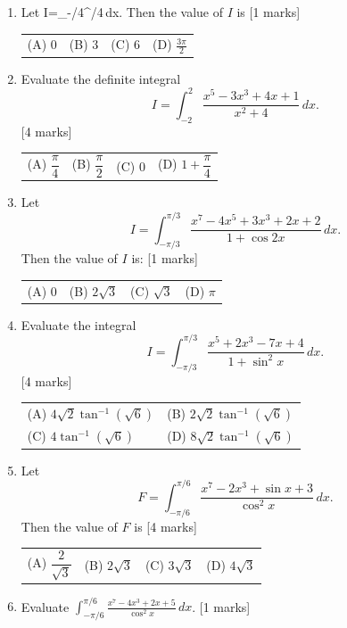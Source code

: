 \documentclass[11pt,a4paper]{article}
\begin{document}
\begin{enumerate}[resume]
{\begin{tabularx}{\linewidth}{X X X X}
\end{tabularx}}
\item Let \displaystyle I=\int_{-\pi/4}^{\pi/4}\,dx. Then the value of \(I\) is \hfill [1 marks]
{\renewcommand{\arraystretch}{1.8}
\begin{tabularx}{\linewidth}{X X X X}
(A) \quad \(0\) & (B) \quad \(3\) & (C) \quad \(6\) & (D) \quad \(\frac{3\pi}{2}\) \\[10pt]
\end{tabularx}}
\item Evaluate the definite integral
\[
I=\int_{-2}^{2}\frac{x^5-3x^3+4x+1}{x^2+4}\,dx.
\] \hfill [4 marks]
{\renewcommand{\arraystretch}{1.8}
\begin{tabularx}{\linewidth}{X X X X}
(A) \quad $\dfrac{\pi}{4}$ & (B) \quad $\dfrac{\pi}{2}$ & (C) \quad $0$ & (D) \quad $1+\dfrac{\pi}{4}$ \\[10pt]
\end{tabularx}}
\item Let \[I=\int_{-\pi/3}^{\pi/3}\frac{x^7-4x^5+3x^3+2x+2}{1+\cos 2x}\,dx.\] Then the value of $I$ is: \hfill [1 marks]
{\renewcommand{\arraystretch}{1.8}
\begin{tabularx}{\linewidth}{X X X X}
(A) \quad $0$ & (B) \quad $2\sqrt{3}$ & (C) \quad $\sqrt{3}$ & (D) \quad $\pi$ \\[10pt]
\end{tabularx}}
\item Evaluate the integral
\[
I=\int_{-\pi/3}^{\pi/3}\frac{x^5+2x^3-7x+4}{1+\sin^2 x}\,dx.
\] \hfill [4 marks]
{\renewcommand{\arraystretch}{1.8}
\begin{tabularx}{\linewidth}{X X}
(A) \quad $4\sqrt{2}\tan^{-1}(\sqrt{6})$ & (B) \quad $2\sqrt{2}\tan^{-1}(\sqrt{6})$ \\[10pt]
(C) \quad $4\tan^{-1}(\sqrt{6})$ & (D) \quad $8\sqrt{2}\tan^{-1}(\sqrt{6})$ \\[10pt]
\end{tabularx}}
\item Let $$F=\int_{-\pi/6}^{\pi/6}\frac{x^7-2x^3+\sin x+3}{\cos^2 x}\,dx.$$ Then the value of $F$ is \hfill [4 marks]
{\renewcommand{\arraystretch}{1.8}
\begin{tabularx}{\linewidth}{X X X X}
(A) \quad $\dfrac{2}{\sqrt{3}}$ & (B) \quad $2\sqrt{3}$ & (C) \quad $3\sqrt{3}$ & (D) \quad $4\sqrt{3}$ \\[10pt]
\end{tabularx}}
\item Evaluate $\displaystyle \int_{-\pi/6}^{\pi/6}\frac{x^7-4x^3+2x+5}{\cos^2 x}\,dx$. \hfill [1 marks]

\end{enumerate}
\end{document}
